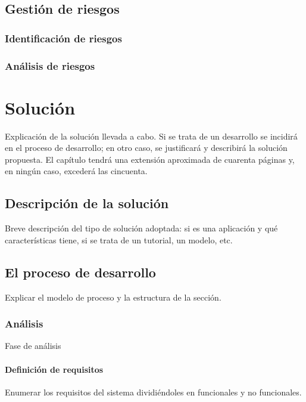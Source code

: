 \documentclass[12pt,a4paper,onecolumn,oneside]{report}
\begin{document}
\section{Gestión de riesgos}

\subsection{Identificación de riesgos}

\subsection{Análisis de riesgos}



\chapter{Solución}
\label{Solución}

Explicación de la solución llevada a cabo. Si se trata de un desarrollo se incidirá en el proceso de desarrollo; en otro caso, se justificará y describirá la solución propuesta. El capítulo tendrá una extensión aproximada de cuarenta páginas y, en ningún caso, excederá las cincuenta.

\section{Descripción de la solución}

Breve descripción del tipo de solución adoptada: si es una aplicación y qué características tiene, si se trata de un tutorial, un modelo, etc.


\section{El proceso de desarrollo}

Explicar el modelo de proceso y la estructura de la sección.

\subsection{Análisis}

Fase de análisis


\subsubsection{Definición de requisitos}

Enumerar los requisitos del sistema dividiéndoles en funcionales y no funcionales.
\end{document}
